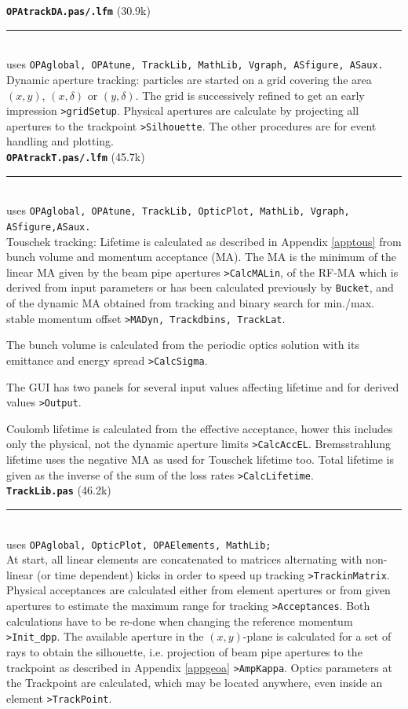 \documentclass[12pt]{article}
\newcommand\code[1]{{\tt #1}}
\newcommand\opamodule[3]{{\bf \tt #1} #2\\  \rule[3pt]{\textwidth}{0.2pt} \\ {\scriptsize uses \tt  #3}\\[1ex]}
\begin{document}
\opamodule{OPAtrackDA.pas/.lfm}{(30.9k)}{OPAglobal,  OPAtune, TrackLib, MathLib, Vgraph, ASfigure, ASaux.}
Dynamic aperture tracking: particles are started on a grid covering the area $(x,y)$, $(x,\delta)$ or $(y,\delta)$. The grid is successively refined to get an early impression \code{>gridSetup}. Physical apertures are calculate by projecting all apertures to the trackpoint \code{>Silhouette}. The other procedures are for event handling and plotting.\\

\opamodule{OPAtrackT.pas/.lfm}{(45.7k)}{OPAglobal,  OPAtune, TrackLib, OpticPlot, MathLib, Vgraph, ASfigure,ASaux.}
Touschek tracking: Lifetime is calculated as described in Appendix \ref{apptous} from bunch volume and momentum acceptance (MA). The MA is the minimum of the linear MA given by the beam pipe apertures \code{>CalcMALin}, of the RF-MA which is derived from input parameters or has been calculated previously by {\tt Bucket}, and of the dynamic MA obtained from tracking and binary search for min./max. stable momentum offset \code{>MADyn, Trackdbins, TrackLat}.

The bunch volume is calculated from the periodic optics solution with its emittance and energy spread \code{>CalcSigma}.

The GUI has two panels for several input values affecting lifetime and for derived values \code{>Output}.

Coulomb lifetime is calculated from the effective acceptance, hower this includes only the physical, not the dynamic aperture limits \code{>CalcAccEL}. Bremsstrahlung lifetime uses the negative MA as used for Touschek lifetime too. Total lifetime is given as the inverse of the sum of the loss rates \code{>CalcLifetime}.\\

\opamodule{TrackLib.pas}{(46.2k)}{OPAglobal, OpticPlot, OPAElements, MathLib;}
At start, all linear elements are concatenated to matrices alternating with non-linear (or time dependent) kicks in order to speed up tracking \code{>TrackinMatrix}. Physical acceptances are calculated either from element apertures or from given apertures to estimate the maximum range for tracking \code{>Acceptances}. Both calculations have to be re-done when changing the reference momentum \code{>Init\_dpp}.
The available aperture in the $(x,y)$-plane is calculated for a set of rays to obtain the silhouette, i.e. projection of beam pipe apertures to the trackpoint as described in Appendix \ref{appgeoa} \code{>AmpKappa}. Optics parameters at the Trackpoint are calculated, which may be located anywhere, even inside an element \code{>TrackPoint}.
\end{document}

